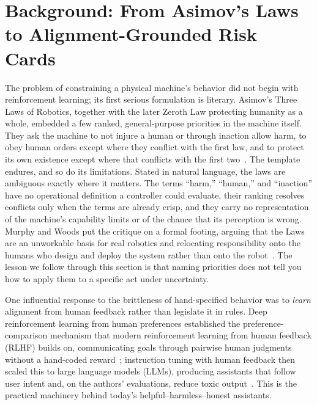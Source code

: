 \documentclass[11pt]{article}
\begin{document}
\section{Background: From Asimov's Laws to Alignment-Grounded Risk Cards}

The problem of constraining a physical machine's behavior did not begin with reinforcement learning; its first serious formulation is literary. Asimov's Three Laws of Robotics, together with the later Zeroth Law protecting humanity as a whole, embedded a few ranked, general-purpose priorities in the machine itself. They ask the machine to not injure a human or through inaction allow harm, to obey human orders except where they conflict with the first law, and to protect its own existence except where that conflicts with the first two~\cite{asimov1950}. The template endures, and so do its limitations. Stated in natural language, the laws are ambiguous exactly where it matters. The terms ``harm,'' ``human,'' and ``inaction'' have no operational definition a controller could evaluate, their ranking resolves conflicts only when the terms are already crisp, and they carry no representation of the machine's capability limits or of the chance that its perception is wrong. Murphy and Woods put the critique on a formal footing, arguing that the Laws are an unworkable basis for real robotics and relocating responsibility onto the humans who design and deploy the system rather than onto the robot~\cite{murphy2009}. The lesson we follow through this section is that naming priorities does not tell you how to apply them to a specific act under uncertainty.

One influential response to the brittleness of hand-specified behavior was to \emph{learn} alignment from human feedback rather than legislate it in rules. Deep reinforcement learning from human preferences established the preference-comparison mechanism that modern reinforcement learning from human feedback (RLHF) builds on, communicating goals through pairwise human judgments without a hand-coded reward~\cite{christiano2017}; instruction tuning with human feedback then scaled this to large language models (LLMs), producing assistants that follow user intent and, on the authors' evaluations, reduce toxic output~\cite{ouyang2022}. This is the practical machinery behind today's helpful--harmless--honest assistants.
\end{document}
